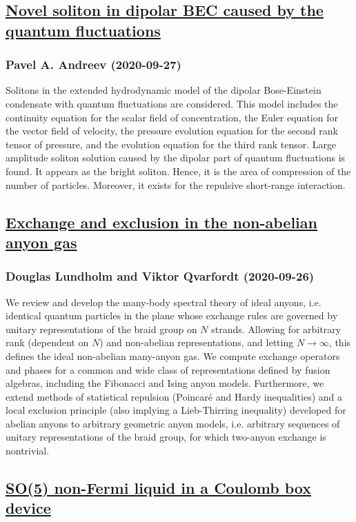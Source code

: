 \subsection*{\href{http://arxiv.org/abs/2009.12720v1}{Novel soliton in dipolar BEC caused by the quantum fluctuations}}
\subsubsection*{Pavel A. Andreev (2020-09-27)}
Solitons in the extended hydrodynamic model of the dipolar Bose-Einstein
condensate with quantum fluctuations are considered. This model includes the
continuity equation for the scalar field of concentration, the Euler equation
for the vector field of velocity, the pressure evolution equation for the
second rank tensor of pressure, and the evolution equation for the third rank
tensor. Large amplitude soliton solution caused by the dipolar part of quantum
fluctuations is found. It appears as the bright soliton. Hence, it is the area
of compression of the number of particles. Moreover, it exists for the
repulsive short-range interaction.

\subsection*{\href{http://arxiv.org/abs/2009.12709v1}{Exchange and exclusion in the non-abelian anyon gas}}
\subsubsection*{Douglas Lundholm and Viktor Qvarfordt (2020-09-26)}
We review and develop the many-body spectral theory of ideal anyons, i.e.
identical quantum particles in the plane whose exchange rules are governed by
unitary representations of the braid group on $N$ strands. Allowing for
arbitrary rank (dependent on $N$) and non-abelian representations, and letting
$N \to \infty$, this defines the ideal non-abelian many-anyon gas. We compute
exchange operators and phases for a common and wide class of representations
defined by fusion algebras, including the Fibonacci and Ising anyon models.
Furthermore, we extend methods of statistical repulsion (Poincar\'e and Hardy
inequalities) and a local exclusion principle (also implying a Lieb-Thirring
inequality) developed for abelian anyons to arbitrary geometric anyon models,
i.e. arbitrary sequences of unitary representations of the braid group, for
which two-anyon exchange is nontrivial.

\subsection*{\href{http://arxiv.org/abs/2009.12700v1}{SO(5) non-Fermi liquid in a Coulomb box device}}
